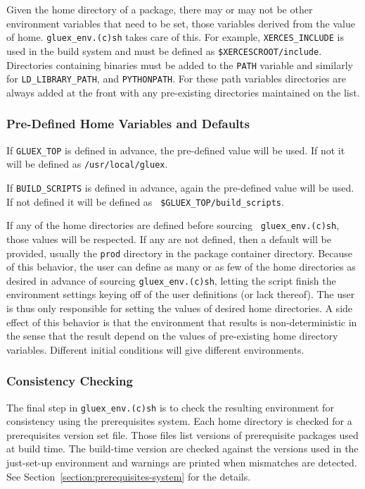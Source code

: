 \documentclass[12pt]{article}
\begin{document}
Given the home directory of a package, there may or may not be other
environment variables that need to be set, those variables derived
from the value of home. {\tt gluex\_env.(c)sh} takes care of this. For
example, {\tt XERCES\_INCLUDE} is used in the build system and must be
defined as {\tt \$XERCESCROOT/include}. Directories containing
binaries must be added to the {\tt PATH} variable and similarly for
{\tt LD\_LIBRARY\_PATH}, and {\tt PYTHONPATH}. For these path
variables directories are always added at the front with any
pre-existing directories maintained on the list.

\subsubsection{Pre-Defined Home Variables and Defaults}

If {\tt GLUEX\_TOP} is defined in advance, the pre-defined value will
be used. If not it will be defined as {\tt /usr/local/gluex}.

If {\tt BUILD\_SCRIPTS} is defined in advance, again the pre-defined
value will be used. If not defined it will be defined as {\tt
  \$GLUEX\_TOP/build\_scripts}.

If any of the home directories are defined before sourcing {\tt
  gluex\_env.(c)sh}, those values will be respected. If any are not
defined, then a default will be provided, usually the {\tt prod}
directory in the package container directory. Because of this
behavior, the user can define as many or as few of the home
directories as desired in advance of sourcing {\tt gluex\_env.(c)sh},
letting the script finish the environment settings keying off of the
user definitions (or lack thereof). The user is thus only responsible
for setting the values of desired home directories. A side effect of
this behavior is that the environment that results is
non-deterministic in the sense that the result depend on the values
of pre-existing home directory variables. Different initial conditions
will give different environments.

\subsubsection{Consistency Checking}

The final step in {\tt gluex\_env.(c)sh} is to check the resulting
environment for consistency using the prerequisites system. Each home
directory is checked for a prerequisites version set file. Those files
list versions of prerequisite packages used at build time. The
build-time version are checked against the versions used in the
just-set-up environment and warnings are printed when mismatches are
detected. See Section~\ref{section:prerequisites-system} for the
details.
\end{document}
